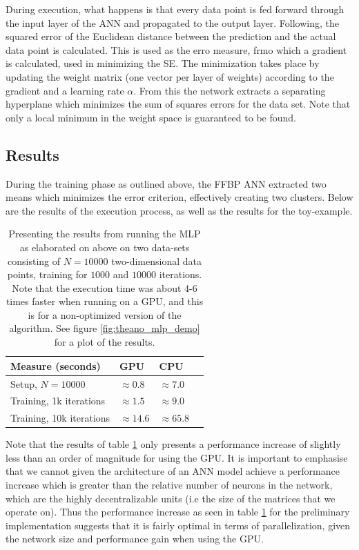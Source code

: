 During execution, what happens is that every data point is fed forward through the input layer of the ANN and propagated to the output layer. Following, the squared error of the Euclidean distance between the prediction and the actual data point is calculated. This is used as the erro measure, frmo which a gradient is calculated, used in minimizing the SE. The minimization takes place by updating the weight matrix (one vector per layer of weights) according to the gradient and a learning rate $\alpha$. From this the network extracts a separating hyperplane which minimizes the sum of squares errors for the data set. Note that only a local minimum in the weight space is guaranteed to be found.

\subsection{Results}

During the training phase as outlined above, the FFBP ANN extracted two means which minimizes the error criterion, effectively creating two clusters. Below are the results of the execution process, as well as the results for the toy-example.


\begin{table}
\begin{center}
    \begin{tabular}{ | l | l | l | l |}
    \hline
    \textbf{Measure (seconds)} & \textbf{GPU} & \textbf{CPU} \\ \hline
     Setup, $N=10 000$ & $\approx0.8$ & $\approx7.0$ \\ \hline
     Training, 1k iterations &  $\approx1.5$ & $\approx9.0$ \\ \hline
     Training, 10k iterations &  $\approx14.6$ & $\approx65.8$ \\ \hline
    \end{tabular}
\end{center}
\caption{Presenting the results from running the MLP as elaborated on above on two data-sets consisting of $N=10 000$ two-dimensional data points, training for $1000$ and $10 000$ iterations. Note that the execution time was about 4-6 times faster when running on a GPU, and this is for a non-optimized version of the algorithm. See figure \ref{fig:theano_mlp_demo} for a plot of the results.}
\label{tab:MLP_gpu_vs_cpu}
\end{table}

Note that the results of table \ref{tab:MLP_gpu_vs_cpu} only presents a performance increase of slightly less than an order of magnitude for using the GPU. It is important to emphasise that we cannot given the architecture of an ANN model achieve a performance increase which is greater than the relative number of neurons in the network, which are the highly decentralizable units (i.e the size of the matrices that we operate on). Thus the performance increase as seen in table \ref{tab:MLP_gpu_vs_cpu} for the preliminary implementation suggests that it is fairly optimal in terms of parallelization, given the network size and performance gain when using the GPU.

